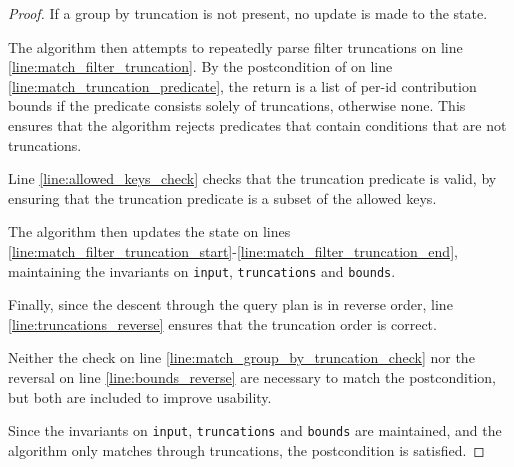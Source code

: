 \documentclass{article}
\begin{document}
\begin{proof}
    If a group by truncation is not present, no update is made to the state.
    
    The algorithm then attempts to repeatedly parse filter truncations on line \ref{line:match_filter_truncation}.
    By the postcondition of  on line \ref{line:match_truncation_predicate},
    the return is a list of per-id contribution bounds if the predicate consists solely of truncations, 
    otherwise none.
    This ensures that the algorithm rejects predicates that contain conditions that are not truncations.

    Line \ref{line:allowed_keys_check} checks that the truncation predicate is valid,
    by ensuring that the truncation predicate is a subset of the allowed keys.

    The algorithm then updates the state on lines \ref{line:match_filter_truncation_start}-\ref{line:match_filter_truncation_end},
    maintaining the invariants on \texttt{input}, \texttt{truncations} and \texttt{bounds}.

    Finally, since the descent through the query plan is in reverse order,
    line \ref{line:truncations_reverse} ensures that the truncation order is correct.
    
    Neither the check on line \ref{line:match_group_by_truncation_check} 
    nor the reversal on line \ref{line:bounds_reverse} are necessary to match the postcondition,
    but both are included to improve usability.

    Since the invariants on \texttt{input}, \texttt{truncations} and \texttt{bounds} are maintained,
    and the algorithm only matches through truncations,
    the postcondition is satisfied.
\end{proof}
\end{document}

